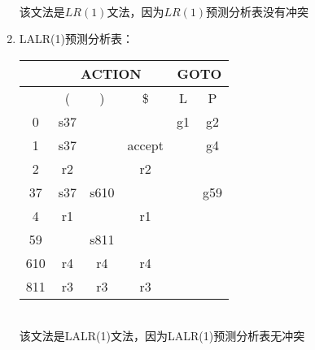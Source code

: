 \documentclass[a4paper, justified]{tufte-handout}
\begin{document}
\begin{solution}
\begin{enumerate}[(1)]
\begin{tabular}{|c|c|c|c|c|c|}
        \end{tabular}\\
        该文法是$LR(1)$文法，因为$LR(1)$预测分析表没有冲突
    \item LALR(1)预测分析表：\\
    \begin{tabular}{|c|c|c|c|c|c|}
        \hline
            & \multicolumn{3}{c|}{ACTION} & \multicolumn{2}{c|}{GOTO} \\ \hline
            & (      & )       & \$        & L           & P           \\ \hline
        0   & s37    &         &          & g1          & g2          \\ \hline
        1   & s37     &         & accept   &             & g4          \\ \hline
        2   & r2     &         & r2       &             &             \\ \hline
        37  & s37    & s610    &          &             & g59         \\ \hline
        4   & r1     &         & r1       &             &             \\ \hline
        59  &        & s811    &          &             &             \\ \hline
        610 & r4     & r4      & r4       &             &             \\ \hline
        811 & r3     & r3      & r3       &             &             \\ \hline
        \end{tabular}\\
        该文法是LALR(1)文法，因为LALR(1)预测分析表无冲突
\end{enumerate}
\end{solution}




\end{document}
